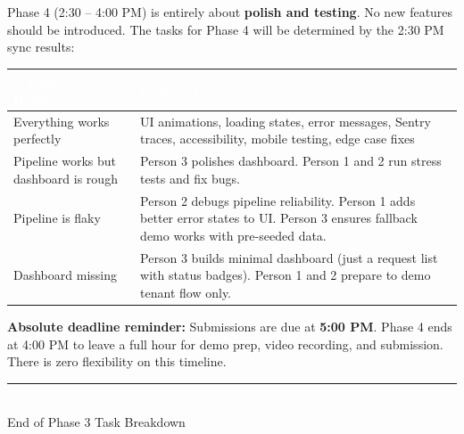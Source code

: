 \documentclass[11pt, a4paper]{article}
\begin{document}
Phase 4 (2:30 -- 4:00 PM) is entirely about \textbf{polish and testing}. No new features should be introduced. The tasks for Phase 4 will be determined by the 2:30 PM sync results:

\begin{tabularx}{\textwidth}{|l|X|}
\hline
\rowcolor{primary}
\textcolor{white}{\textbf{If Phase 3 Result...}} & \textcolor{white}{\textbf{Phase 4 Focus}} \\
\hline
Everything works perfectly & UI animations, loading states, error messages, Sentry traces, accessibility, mobile testing, edge case fixes \\
\hline
Pipeline works but dashboard is rough & Person 3 polishes dashboard. Person 1 and 2 run stress tests and fix bugs. \\
\hline
Pipeline is flaky & Person 2 debugs pipeline reliability. Person 1 adds better error states to UI. Person 3 ensures fallback demo works with pre-seeded data. \\
\hline
Dashboard missing & Person 3 builds minimal dashboard (just a request list with status badges). Person 1 and 2 prepare to demo tenant flow only. \\
\hline
\end{tabularx}

\vspace{0.5em}

\begin{dangerbox}
\textbf{Absolute deadline reminder:} Submissions are due at \textbf{5:00 PM}. Phase 4 ends at 4:00 PM to leave a full hour for demo prep, video recording, and submission. There is zero flexibility on this timeline.
\end{dangerbox}

\vspace{2em}

\begin{center}
\textcolor{textmuted}{\rule{0.4\textwidth}{0.4pt}}\\[6pt]
\textcolor{textmuted}{\small End of Phase 3 Task Breakdown}
\end{center}
\end{document}
